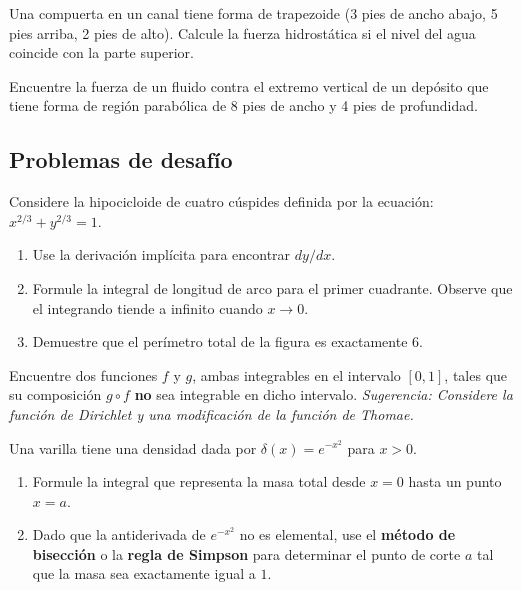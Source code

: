 
\begin{prob}
Una compuerta en un canal tiene forma de trapezoide (3 pies de ancho abajo, 5 pies arriba, 2 pies de alto). Calcule la fuerza hidrostática si el nivel del agua coincide con la parte superior.
\end{prob}

\begin{prob}
Encuentre la fuerza de un fluido contra el extremo vertical de un depósito que tiene forma de región parabólica de 8 pies de ancho y 4 pies de profundidad.
\end{prob}

\subsection{Problemas de desafío}


\begin{prob} Considere la hipocicloide de cuatro cúspides definida por la ecuación: $x^{2/3} + y^{2/3} = 1$.
\begin{enumerate} 
  \item Use la derivación implícita para encontrar $dy/dx$.
  \item Formule la integral de longitud de arco para el primer cuadrante. Observe que el integrando tiende a infinito cuando $x \to 0$.
  \item Demuestre que el perímetro total de la figura es exactamente $6$.
\end{enumerate}
\end{prob}

\begin{prob} Encuentre dos funciones $f$ y $g$, ambas integrables en el intervalo $[0,1]$, tales que su composición $g \circ f$ \textbf{no} sea integrable en dicho intervalo. \textit{Sugerencia: Considere la función de Dirichlet y una modificación de la función de Thomae.}
\end{prob}

\begin{prob} Una varilla tiene una densidad dada por $\delta(x) = e^{-x^2}$ para $x > 0$. 
\begin{enumerate} 
  \item Formule la integral que representa la masa total desde $x=0$ hasta un punto $x=a$.
  \item Dado que la antiderivada de $e^{-x^2}$ no es elemental, use el \textbf{método de bisección} o la \textbf{regla de Simpson} para determinar el punto de corte $a$ tal que la masa sea exactamente igual a $1$.
\end{enumerate}
\end{prob}

